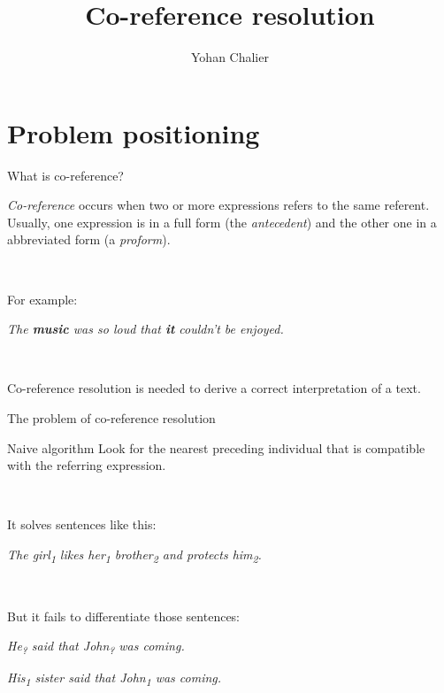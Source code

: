 \documentclass{beamer}
\title{Co-reference resolution}
\author{Yohan Chalier}\institute{Symbolic Natural Language Processing (SD213)}
\begin{document}
\begin{frame}
\titlepage
\end{frame}

\section{Problem positioning}

\begin{frame}{What is co-reference?}

\emph{Co-reference} occurs when two or more expressions refers to the same referent. Usually, one expression is in a full form (the \emph{antecedent}) and the other one in a abbreviated form (a \emph{proform}).

~\par

For example:

\textit{The \textbf{music} was so loud that \textbf{it} couldn't be enjoyed.}

~\par

Co-reference resolution is needed to derive a correct interpretation of a text.

\end{frame}

\begin{frame}{The problem of co-reference resolution}

\begin{block}{Naive algorithm}
Look for the nearest preceding individual that is compatible with the referring expression.
\end{block}

~\par

It solves sentences like this:

{\em \hspace{\parindent} The girl\textsubscript{1} likes her\textsubscript{1} brother\textsubscript{2} and protects him\textsubscript{2}.}

~\par

But it fails to differentiate those sentences:

{\em \hspace{\parindent} He\textsubscript{?} said that John\textsubscript{?} was coming.}

{\em \hspace{\parindent} His\textsubscript{1} sister said that John\textsubscript{1} was coming.}

\end{frame}
\end{document}
